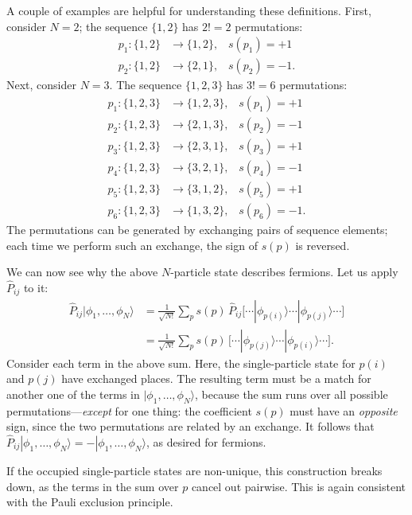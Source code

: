\documentclass[pra,12pt]{revtex4}
\begin{document}
A couple of examples are helpful for understanding these definitions.
First, consider $N=2$; the sequence $\{1,2\}$ has $2! = 2$ permutations:
$$\begin{aligned}p_1 : \{1,2\} &\rightarrow \{1,2\}, \;\;\;s(p_1) = +1 \\ p_2 : \{1,2\} &\rightarrow \{2,1\}, \;\;\;s(p_2) = -1.\end{aligned}$$
Next, consider $N=3$.  The sequence $\{1,2,3\}$ has $3!=6$ permutations:
$$\begin{aligned}
  p_1 : \{1,2,3\} &\rightarrow \{1,2,3\}, \;\;\;s(p_1) = +1 \\
  p_2 : \{1,2,3\} &\rightarrow \{2,1,3\}, \;\;\;s(p_2) = -1 \\
  p_3 : \{1,2,3\} &\rightarrow \{2,3,1\}, \;\;\;s(p_3) = +1 \\
  p_4 : \{1,2,3\} &\rightarrow \{3,2,1\}, \;\;\;s(p_4) = -1 \\
  p_5 : \{1,2,3\} &\rightarrow \{3,1,2\}, \;\;\;s(p_5) = +1 \\
  p_6 : \{1,2,3\} &\rightarrow \{1,3,2\}, \;\;\;s(p_6) = -1.\end{aligned}$$
The permutations can be generated by exchanging pairs of sequence
elements; each time we perform such an exchange, the sign of $s(p)$
is reversed.

We can now see why the above $N$-particle state describes fermions.
Let us apply $\hat{P}_{ij}$ to it:
$$\begin{aligned}\hat{P}_{ij}|\phi_1,\dots,\phi_N\rangle &= \frac{1}{\sqrt{N!}} \sum_p s(p)\, \hat{P}_{ij} \big[\cdots |\phi_{p(i)}\rangle \cdots |\phi_{p(j)}\rangle \cdots\big] \\&= \frac{1}{\sqrt{N!}} \sum_p s(p)\, \big[\cdots |\phi_{p(j)}\rangle \cdots |\phi_{p(i)}\rangle \cdots\big].\end{aligned}$$
Consider each term in the above sum.  Here, the single-particle state
for $p(i)$ and $p(j)$ have exchanged places.  The resulting term must
be a match for another one of the terms in
$|\phi_1,\dots,\phi_N\rangle$, because the sum runs over all possible
permutations---\textit{except} for one thing: the coefficient $s(p)$
must have an \textit{opposite} sign, since the two permutations are
related by an exchange.  It follows that
$\hat{P}_{ij}|\phi_1,\dots,\phi_N\rangle = -
|\phi_1,\dots,\phi_N\rangle$, as desired for fermions.

If the occupied single-particle states are non-unique, this
construction breaks down, as the terms in the sum over $p$ cancel out
pairwise.  This is again consistent with the Pauli exclusion
principle.
\end{document}
